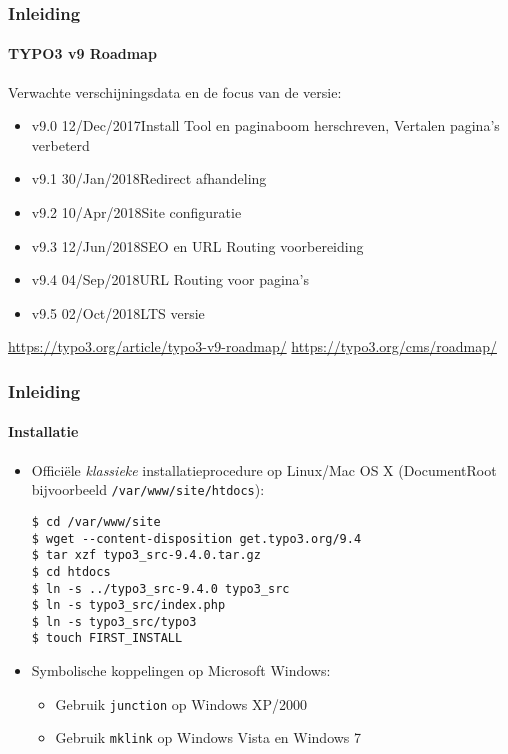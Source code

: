 
\begin{frame}[fragile]
	\frametitle{Inleiding}
	\framesubtitle{TYPO3 v9 Roadmap}

	Verwachte verschijningsdata en de focus van de versie:

	\begin{itemize}

		\item v9.0 \tabto{1.1cm}12/Dec/2017\tabto{3.4cm}Install Tool en paginaboom herschreven,\newline
			\tabto{3.4cm}Vertalen pagina's verbeterd
		\item v9.1 \tabto{1.1cm}30/Jan/2018\tabto{3.4cm}Redirect afhandeling
		\item v9.2 \tabto{1.1cm}10/Apr/2018\tabto{3.4cm}Site configuratie
        \item v9.3 \tabto{1.1cm}12/Jun/2018\tabto{3.4cm}SEO en URL Routing voorbereiding
		\item
			\begingroup
				\color{typo3orange}
                    v9.4 \tabto{1.1cm}04/Sep/2018\tabto{3.4cm}URL Routing voor pagina's
			\endgroup
		\item v9.5 \tabto{1.1cm}02/Oct/2018\tabto{3.4cm}LTS versie

	\end{itemize}

	\smaller
		\url{https://typo3.org/article/typo3-v9-roadmap/}\newline
		\url{https://typo3.org/cms/roadmap/}
	\normalsize

\end{frame}


\begin{frame}[fragile]
	\frametitle{Inleiding}
	\framesubtitle{Installatie}

	\begin{itemize}
		\item Officiële \textit{klassieke} installatieprocedure op Linux/Mac OS X\newline
			(DocumentRoot bijvoorbeeld \texttt{/var/www/site/htdocs}):
		\begin{lstlisting}
$ cd /var/www/site
$ wget --content-disposition get.typo3.org/9.4
$ tar xzf typo3_src-9.4.0.tar.gz
$ cd htdocs
$ ln -s ../typo3_src-9.4.0 typo3_src
$ ln -s typo3_src/index.php
$ ln -s typo3_src/typo3
$ touch FIRST_INSTALL
		\end{lstlisting}

		\item Symbolische koppelingen op Microsoft Windows:

			\begin{itemize}
				\item Gebruik \texttt{junction} op Windows XP/2000
				\item Gebruik \texttt{mklink} op Windows Vista en Windows 7
			\end{itemize}

	\end{itemize}
\end{frame}

